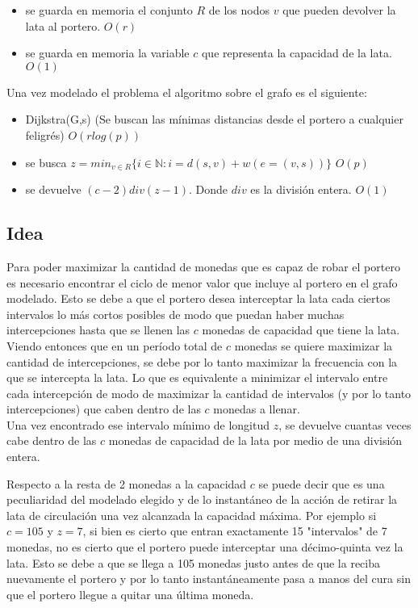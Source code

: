 \documentclass[a4paper]{article}
\begin{document}
\begin{itemize}
    \item se guarda en memoria el conjunto $R$ de los nodos $v$ que pueden devolver la lata al portero. $O(r)$
    \item se guarda en memoria la variable $c$ que representa la capacidad de la lata. $O(1)$
\end{itemize}

Una vez modelado el problema el algoritmo sobre el grafo es el siguiente:

\begin{itemize}
    \item Dijkstra(G,s) (Se buscan las mínimas distancias desde el portero a cualquier feligrés) $O(rlog(p))$
    \item se busca $ z = min_{v \in R} \{i \in \mathbb{N} : i = d(s,v) + w( e = (v,s) )\}$ $O(p)$
    \item se devuelve $(c-2) div (z-1)$. Donde $div$ es la división entera. $O(1)$
\end{itemize}


\subsection{Idea}

Para poder maximizar la cantidad de monedas que es capaz de robar el portero es necesario encontrar el ciclo de menor valor que incluye al portero en el grafo modelado. Esto se debe a que el portero desea interceptar la lata cada ciertos intervalos lo más cortos posibles de modo que puedan haber muchas intercepciones hasta que se llenen las $c$ monedas de capacidad que tiene la lata. Viendo entonces que en un período total de $c$ monedas se quiere maximizar la cantidad de intercepciones, se debe por lo tanto maximizar la frecuencia con la que se intercepta la lata. Lo que es equivalente a minimizar el intervalo entre cada intercepción de modo de maximizar la cantidad de intervalos (y por lo tanto intercepciones) que caben dentro de las $c$ monedas a llenar.
\\
Una vez encontrado ese intervalo mínimo de longitud $z$, se devuelve cuantas veces cabe dentro de las $c$ monedas de capacidad de la lata por medio de una división entera.

Respecto a la resta de 2 monedas a la capacidad $c$ se puede decir que es una peculiaridad del modelado elegido y de lo instantáneo de la acción de retirar la lata de circulación una vez alcanzada la capacidad máxima. Por ejemplo si $c=105$ y $z=7$, si bien es cierto que entran exactamente 15 "intervalos" de 7 monedas, no es cierto que el portero puede interceptar una décimo-quinta vez la lata. Esto se debe a que se llega a 105 monedas justo antes de que la reciba nuevamente el portero y por lo tanto instantáneamente pasa a manos del cura sin que el portero llegue a quitar una última moneda.
\end{document}
